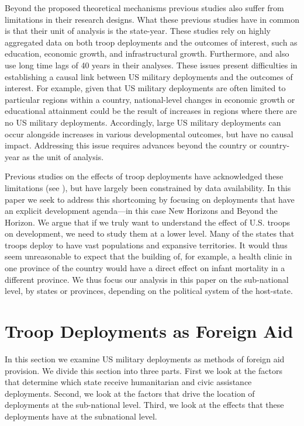 \documentclass[12pt]{article}
\begin{document}
\begin{doublespace}
Beyond the proposed theoretical mechanisms previous studies also suffer from limitations in their research designs. What these previous studies have in common is that their unit of analysis is the state-year. These studies rely on highly aggregated data on both troop deployments and the outcomes of interest, such as education, economic growth, and infrastructural growth. Furthermore,  and  also use long time lags of 40 years in their analyses. These issues present difficulties in establishing a causal link between US military deployments and the outcomes of interest. For example, given that US military deployments are often limited to particular regions within a country, national-level changes in economic growth or educational attainment could be the result of increases in regions where there are no US military deployments. Accordingly, large US military deployments can occur alongside increases in various developmental outcomes, but have no causal impact. Addressing this issue requires advances beyond the country or country-year as the unit of analysis. 

Previous studies on the effects of troop deployments have acknowledged these limitations (see ), but have largely been constrained by data availability.  In this paper we seek to address this shortcoming by focusing on deployments that have an explicit development agenda---in this case New Horizons and Beyond the Horizon. We argue that if we truly want to understand the effect of U.S. troops on development, we need to study them at a lower level.  Many of the states that troops deploy to have vast populations and expansive territories.  It would thus seem unreasonable to expect that the building of, for example, a health clinic in one province of the country would have a direct effect on infant mortality in a different province.  We thus focus our analysis in this paper on the sub-national level, by states or provinces, depending on the political system of the host-state.  


\section{Troop Deployments as Foreign Aid}

In this section we examine US military deployments as methods of foreign aid provision. We divide this section into three parts. First we look at the factors that determine which state receive humanitarian and civic assistance deployments. Second, we look at the factors that drive the location of deployments at the sub-national level. Third, we look at the effects that these deployments have at the subnational level.



\end{doublespace}
\end{document}

